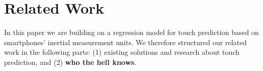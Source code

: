 \section{Related Work}
\label{sec:relw}
In this paper we are building on a regression model for touch prediction based on smartphones' inertial measurement units. 
We therefore structured our related work in the following parts: (1) existing solutions and research about touch prediction, and (2) \textbf{who the hell knows}.

